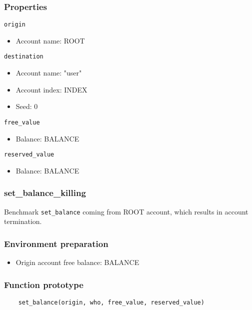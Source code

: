 \documentclass[11pt,a4paper]{article}
\begin{document}
\subsubsection*{Properties}
\verb|origin|
\begin{itemize}
\item Account name: ROOT
\end{itemize}
\verb|destination|
\begin{itemize}
\item Account name: "user"
\item Account index: INDEX
\item Seed: 0
\end{itemize}
\verb|free_value|
\begin{itemize}
\item Balance: BALANCE
\end{itemize}
\verb|reserved_value|
\begin{itemize}
\item Balance: BALANCE
\end{itemize}

\subsubsection{set\_balance\_killing}

Benchmark \verb|set_balance| coming from ROOT account, which results in account termination.

\subsubsection*{Environment preparation}
\begin{itemize}
    \item Origin account free balance: BALANCE
\end{itemize}

\subsubsection*{Function prototype}
\begin{verbatim}
    set_balance(origin, who, free_value, reserved_value)
\end{verbatim}
\end{document}

